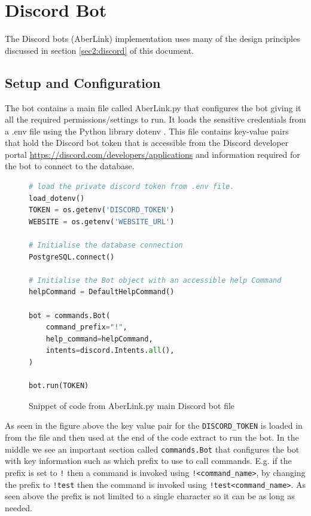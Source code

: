 \section{Discord Bot}
The Discord bots (AberLink) implementation uses many of the design principles discussed in section \ref{sec2:discord} of this document.

\subsection{Setup and Configuration}\label{sec3:discord-setup}
The bot contains a main file called AberLink.py that configures the bot giving it all the required permissions/settings to run. It loads the sensitive credentials from a .env file using the Python library dotenv \cite{dotenv}. This file contains key-value pairs that hold the Discord bot token that is accessible from the Discord developer portal \url{https://discord.com/developers/applications} and information required for the bot to connect to the database.

\begin{figure}[H]
\begin{lstlisting}[language=Python]
# load the private discord token from .env file.
load_dotenv()
TOKEN = os.getenv('DISCORD_TOKEN')
WEBSITE = os.getenv('WEBSITE_URL')

# Initialise the database connection
PostgreSQL.connect()

# Initialise the Bot object with an accessible help Command object
helpCommand = DefaultHelpCommand()

bot = commands.Bot(
    command_prefix="!",
    help_command=helpCommand,
    intents=discord.Intents.all(),
)

bot.run(TOKEN)
\end{lstlisting}
\caption{Snippet of code from AberLink.py main Discord bot file}
\label{fig:discord-main-file}
\end{figure}

As seen in the figure above the key value pair for the \verb|DISCORD_TOKEN| is loaded in from the file and then used at the end of the code extract to run the bot. In the middle we see an important section called \verb|commands.Bot| that configures the bot with key information such as which prefix to use to call commands. E.g. if the prefix is set to \verb|!| then a command is invoked using \verb|!<command_name>|, by changing the prefix to \verb|!test| then the command is invoked using \verb|!test<command_name>|. As seen above the prefix is not limited to a single character so it can be as long as needed.

